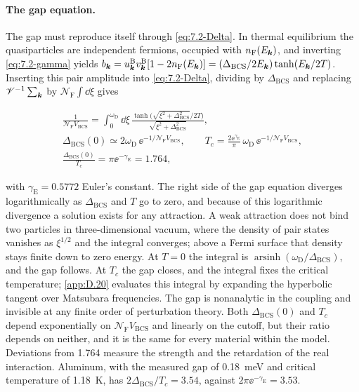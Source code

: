 \paragraph{The gap equation.} The gap must reproduce itself through \cref{eq:7.2-Delta}. In thermal equilibrium the quasiparticles are independent fermions, occupied with $n_{\mathrm{F}}(E_{\bm{k}})$, and inverting \cref{eq:7.2-gamma} yields $b_{\bm{k}} = u^{\mathrm{B}}_{\bm{k}}v^{\mathrm{B}}_{\bm{k}}[1 - 2n_{\mathrm{F}}(E_{\bm{k}})] = (\Delta_{\mathrm{BCS}}/2E_{\bm{k}})\tanh(E_{\bm{k}}/2T)$. Inserting this pair amplitude into \cref{eq:7.2-Delta}, dividing by $\Delta_{\mathrm{BCS}}$ and replacing $\mathscr{V}^{-1}\sum_{\bm{k}}$ by $\mathcal{N}_{\mathrm{F}}\int\dd\xi$ gives
\begin{keyresult}
\begin{equation}
  \begin{gathered}
  \frac{1}{\mathcal{N}_{\mathrm{F}}V_{\mathrm{BCS}}} = \int_0^{\omega_{\mathrm{D}}}\dd\xi\,\frac{\tanh\bigl(\sqrt{\xi^2 + \Delta_{\mathrm{BCS}}^2}/2T\bigr)}{\sqrt{\xi^2 + \Delta_{\mathrm{BCS}}^2}} , \\
  \Delta_{\mathrm{BCS}}(0) \simeq 2\omega_{\mathrm{D}}\,\ee^{-1/\mathcal{N}_{\mathrm{F}}V_{\mathrm{BCS}}}, \qquad
  T_c = \frac{2\ee^{\gamma_{\mathrm{E}}}}{\pi}\,\omega_{\mathrm{D}}\,\ee^{-1/\mathcal{N}_{\mathrm{F}}V_{\mathrm{BCS}}}, \\
  \frac{\Delta_{\mathrm{BCS}}(0)}{T_c} = \pi\ee^{-\gamma_{\mathrm{E}}} = 1.764 ,
  \end{gathered}
  \label{eq:7.2-gap}
\end{equation}
\end{keyresult}
with $\gamma_{\mathrm{E}} = 0.5772$ Euler's constant. The right side of the gap equation diverges logarithmically as $\Delta_{\mathrm{BCS}}$ and $T$ go to zero, and because of this logarithmic divergence a solution exists for any attraction. A weak attraction does not bind two particles in three-dimensional vacuum, where the density of pair states vanishes as $\xi^{1/2}$ and the integral converges; above a Fermi surface that density stays finite down to zero energy. At $T = 0$ the integral is $\operatorname{arsinh}(\omega_{\mathrm{D}}/\Delta_{\mathrm{BCS}})$, and the gap follows. At $T_c$ the gap closes, and the integral fixes the critical temperature; \cref{app:D.20} evaluates this integral by expanding the hyperbolic tangent over Matsubara frequencies. The gap is nonanalytic in the coupling and invisible at any finite order of perturbation theory. Both $\Delta_{\mathrm{BCS}}(0)$ and $T_c$ depend exponentially on $\mathcal{N}_{\mathrm{F}}V_{\mathrm{BCS}}$ and linearly on the cutoff, but their ratio depends on neither, and it is the same for every material within the model. Deviations from 1.764 measure the strength and the retardation of the real interaction. Aluminum, with the measured gap of \SI{0.18}{meV} and critical temperature of \SI{1.18}{K}, has $2\Delta_{\mathrm{BCS}}/T_c = 3.54$, against $2\pi\ee^{-\gamma_{\mathrm{E}}} = 3.53$.

